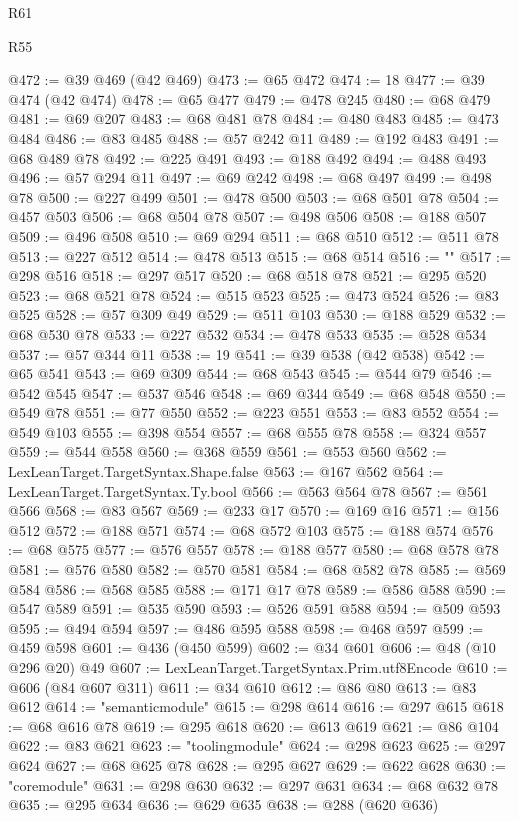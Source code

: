 \begin{lexlean}{R61}
\begin{lexlean}{R55}
\begin{coremodule}
{{{{{{{{{{{{{{{{{{{{{{{{{{{{{{{{{{{{{{{{{{{{{{{{{{{{{{{{{{{{{@472 := @39 @469 (@42 @469)
@473 := @65 @472
@474 := 18
@477 := @39 @474 (@42 @474)
@478 := @65 @477
@479 := @478 @245
@480 := @68 @479
@481 := @69 @207
@483 := @68 @481 @78
@484 := @480 @483
@485 := @473 @484
@486 := @83 @485
@488 := @57 @242 @11
@489 := @192 @483
@491 := @68 @489 @78
@492 := @225 @491
@493 := @188 @492
@494 := @488 @493
@496 := @57 @294 @11
@497 := @69 @242
@498 := @68 @497
@499 := @498 @78
@500 := @227 @499
@501 := @478 @500
@503 := @68 @501 @78
@504 := @457 @503
@506 := @68 @504 @78
@507 := @498 @506
@508 := @188 @507
@509 := @496 @508
@510 := @69 @294
@511 := @68 @510
@512 := @511 @78
@513 := @227 @512
@514 := @478 @513
@515 := @68 @514
@516 := "{"
@517 := @298 @516
@518 := @297 @517
@520 := @68 @518 @78
@521 := @295 @520
@523 := @68 @521 @78
@524 := @515 @523
@525 := @473 @524
@526 := @83 @525
@528 := @57 @309 @49
@529 := @511 @103
@530 := @188 @529
@532 := @68 @530 @78
@533 := @227 @532
@534 := @478 @533
@535 := @528 @534
@537 := @57 @344 @11
@538 := 19
@541 := @39 @538 (@42 @538)
@542 := @65 @541
@543 := @69 @309
@544 := @68 @543
@545 := @544 @79
@546 := @542 @545
@547 := @537 @546
@548 := @69 @344
@549 := @68 @548
@550 := @549 @78
@551 := @77 @550
@552 := @223 @551
@553 := @83 @552
@554 := @549 @103
@555 := @398 @554
@557 := @68 @555 @78
@558 := @324 @557
@559 := @544 @558
@560 := @368 @559
@561 := @553 @560
@562 := LexLeanTarget.TargetSyntax.Shape.false
@563 := @167 @562
@564 := LexLeanTarget.TargetSyntax.Ty.bool
@566 := @563 @564 @78
@567 := @561 @566
@568 := @83 @567
@569 := @233 @17
@570 := @169 @16
@571 := @156 @512
@572 := @188 @571
@574 := @68 @572 @103
@575 := @188 @574
@576 := @68 @575
@577 := @576 @557
@578 := @188 @577
@580 := @68 @578 @78
@581 := @576 @580
@582 := @570 @581
@584 := @68 @582 @78
@585 := @569 @584
@586 := @568 @585
@588 := @171 @17 @78
@589 := @586 @588
@590 := @547 @589
@591 := @535 @590
@593 := @526 @591 @588
@594 := @509 @593
@595 := @494 @594
@597 := @486 @595 @588
@598 := @468 @597
@599 := @459 @598
@601 := @436 (@450 @599)
@602 := @34 @601
@606 := @48 (@10 @296 @20) @49
@607 := LexLeanTarget.TargetSyntax.Prim.utf8Encode
@610 := @606 (@84 @607 @311)
@611 := @34 @610
@612 := @86 @80
@613 := @83 @612
@614 := "semanticmodule"
@615 := @298 @614
@616 := @297 @615
@618 := @68 @616 @78
@619 := @295 @618
@620 := @613 @619
@621 := @86 @104
@622 := @83 @621
@623 := "toolingmodule"
@624 := @298 @623
@625 := @297 @624
@627 := @68 @625 @78
@628 := @295 @627
@629 := @622 @628
@630 := "coremodule"
@631 := @298 @630
@632 := @297 @631
@634 := @68 @632 @78
@635 := @295 @634
@636 := @629 @635
@638 := @288 (@620 @636)
}}}}}}}}}}}}}}}}}}}}}}}}}}}}}}}}}}}}}}}}}}}}}}}}}}}}}}}}}}}}}}
\end{coremodule}
\end{lexlean}
\end{lexlean}
